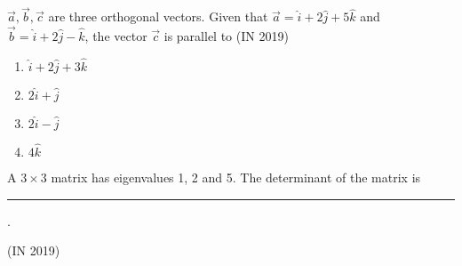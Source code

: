 \item $\vec{a}, \vec{b}, \vec{c}$ are three orthogonal vectors. Given that $\vec{a} = \hat{i} + 2\hat{j} + 5\hat{k}$ and $\vec{b} = \hat{i} + 2\hat{j} - \hat{k}$, the vector $\vec{c}$ is parallel to
\hfill(IN 2019)
\begin{multicols}{4}
\begin{enumerate}
\item $\hat{i} + 2\hat{j} + 3\hat{k}$
\item $2\hat{i} + \hat{j}$
\item $2\hat{i} - \hat{j}$
\item $4\hat{k}$
\end{enumerate}
\end{multicols} 
\item A $3 \times 3$ matrix has eigenvalues 1, 2 and 5. The determinant of the matrix is \rule{1cm}{0.01pt}.

\hfill(IN 2019)
